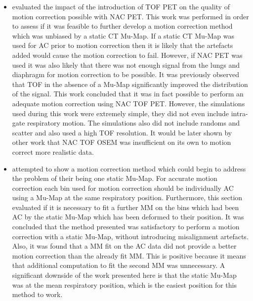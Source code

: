         \begin{itemize}
            \item {} evaluated the impact of the introduction of \gls{TOF} \gls{PET} on the quality of motion correction possible with \gls{NAC} \gls{PET}. This work was performed in order to assess if it was feasible to further develop a motion correction method which was unbiased by a static \gls{CT} \gls{Mu-Map}. If a static \gls{CT} \gls{Mu-Map} was used for \gls{AC} prior to motion correction then it is likely that the artefacts added would cause the motion correction to fail. However, if \gls{NAC} \gls{PET} was used it was also likely that there was not enough signal from the lungs and diaphragm for motion correction to be possible. It was previously observed that \gls{TOF} in the absence of a \gls{Mu-Map} significantly improved the distribution of the signal. This work concluded that it was in fact possible to perform an adequate motion correction using \gls{NAC} \gls{TOF} \gls{PET}. However, the simulations used during this work were extremely simple, they did not even include intra-gate respiratory motion. The simulations also did not include randoms and scatter and also used a high \gls{TOF} resolution. It would be later shown by other work that \gls{NAC} \gls{TOF} \gls{OSEM} was insufficient on its own to motion correct more realistic data.

            \item {} attempted to show a motion correction method which could begin to address the problem of their being one static \gls{Mu-Map}. For accurate motion correction each bin used for motion correction should be individually \gls{AC} using a \gls{Mu-Map} at the same respiratory position. Furthermore, this section evaluated if it is necessary to fit a further \gls{MM} on the bins which had been \gls{AC} by the static \gls{Mu-Map} which has been deformed to their position. It was concluded that the method presented was satisfactory to perform a motion correction with a static \gls{Mu-Map}, without introducing misalignment artefacts. Also, it was found that a \gls{MM} fit on the \gls{AC} data did not provide a better motion correction than the already fit \gls{MM}. This is positive because it means that additional computation to fit the second \gls{MM} was unnecessary. A significant downside of the work presented here is that the static \gls{Mu-Map} was at the mean respiratory position, which is the easiest position for this method to work.


\end{itemize}
